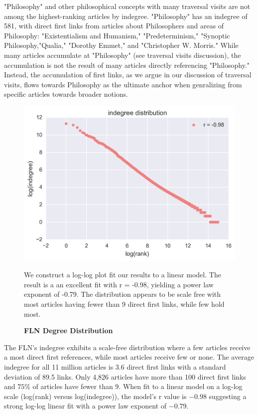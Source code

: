 \documentclass[pre,twocolumn,twoside,superscriptaddress,floatfix, aps, 10pt]{revtex4-1}
\begin{document}
"Philosophy" and other philosophical concepts with many traversal visits
are not among the highest-ranking articles by indegree.
"Philosophy" has an indegree of 581, with direct first links from articles about Philosophers and areas of Philosophy: "Existentialism and Humanism," "Predeterminism," "Synoptic Philosophy,"Qualia," "Dorothy Emmet," and "Christopher W. Morris."
While many articles accumulate at "Philosophy" (see traversal visits discussion), 
the accumulation is not the 
result of many articles directly referencing "Philosophy." 
Instead, the accumulation of first links, as we argue in our 
discussion of traversal visits, flows towards Philosophy as the 
ultimate anchor when genralizing from specific articles towards broader notions.
\begin{figure}[tp!]
  \centering	
  \includegraphics[width=\columnwidth]{graphics/ndegree_loglog.png}
  \caption{
    \textbf{FLN Degree Distribution}
  }
  We construct a log-log plot fit our results to a linear model. The result is a 
  an excellent fit with r = -0.98, yielding a power law exponent of -0.79. 
  The distribution appears to be scale free with most articles having fewer than 9 
  direct first links, while few hold most.
  \label{fig:degree distribution}
\end{figure}
The FLN's indegree exhibits a scale-free distribution where a few articles 
receive a most direct first references, while most articles receive few or none.
The average indegree for all 11 million articles is 3.6 direct first links with a standard deviation of 89.5 links.
Only 4,826 articles have more than 100 direct first links and $75\%$ of articles
have fewer than 9. 
When fit to a linear model on a log-log scale (log(rank) versus log(indegree)), 
the model's r value is $-0.98$ suggesting a strong log-log linear fit 
with a power law exponent of $-0.79$. 
\end{document}
